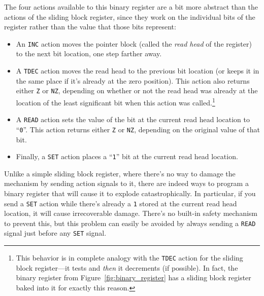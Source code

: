 
The four actions available to this binary register are a bit more abstract than the actions of the sliding block register, since they work on the individual bits of the register rather than the value that those bits represent:\smallskip

\begin{itemize}
	\item An \texttt{INC} action moves the pointer block (called the \emph{read head} of the register) to the next bit location, one step farther away.\smallskip
	
	\item A \texttt{TDEC} action moves the read head to the previous bit location (or keeps it in the same place if it's already at the zero position). This action also returns either \texttt{Z} or \texttt{NZ}, depending on whether or not the read head was already at the location of the least significant bit when this action was called.\footnote{This behavior is in complete analogy with the \texttt{TDEC} action for the sliding block register---it tests and \emph{then} it decrements (if possible). In fact, the binary register from Figure~\ref{fig:binary_register} has a sliding block register baked into it for exactly this reason.}\smallskip
	
	\item A \texttt{READ} action sets the value of the bit at the current read head location to ``\texttt{0}''. This action returns either \texttt{Z} or \texttt{NZ}, depending on the original value of that bit.\smallskip
	
	\item Finally, a \texttt{SET} action places a ``\texttt{1}'' bit at the current read head location.\smallskip
\end{itemize}

Unlike a simple sliding block register, where there's no way to damage the mechanism by sending action signals to it, there are indeed ways to program a binary register that will cause it to explode catastrophically. In particular, if you send a \texttt{SET} action while there's already a \texttt{1} stored at the current read head location, it will cause irrecoverable damage. There's no built-in safety mechanism to prevent this, but this problem can easily be avoided by always sending a \texttt{READ} signal just before any \texttt{SET} signal.

